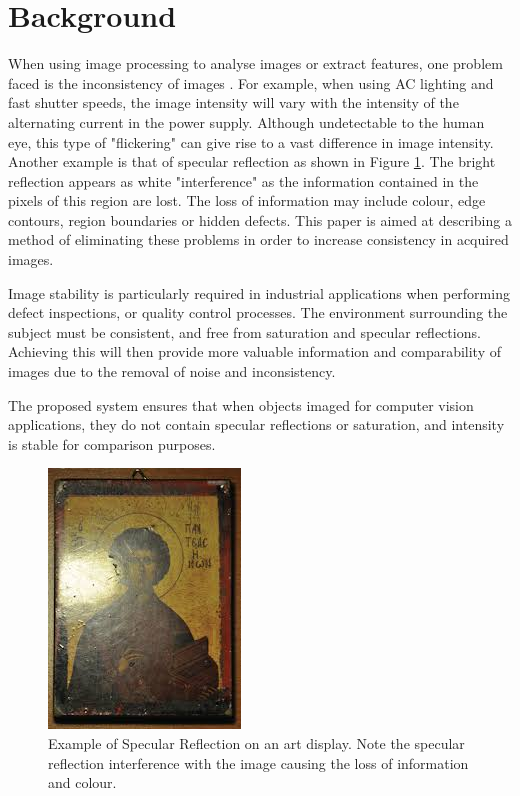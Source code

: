 \documentclass[fleqn,twoside,12pt]{report}
\begin{document}
\section{Background}


When using image processing to analyse images or extract features, one problem faced is the inconsistency of images \cite{atkinson}.  For example, when using AC lighting and fast shutter speeds, the image intensity will vary with the intensity of the alternating current in the power supply. Although undetectable to the human eye, this type of "flickering" can give rise to a vast difference in image intensity. Another example is that of specular reflection as shown in Figure \ref{fig:specular_art}. The bright reflection appears as white "interference" as the information contained in the pixels of this region are lost. The loss of information may include colour, edge contours, region boundaries or hidden defects. This paper is aimed at describing a method of eliminating these problems in order to increase consistency in acquired images.

Image stability is particularly required in industrial applications when performing defect inspections, or quality control processes. The environment surrounding the subject must be consistent, and free from saturation and specular reflections. Achieving this will then provide more valuable information and comparability of images due to the removal of noise and inconsistency.

The proposed system ensures that when objects imaged for computer vision applications, they do not contain specular reflections or saturation, and intensity is stable for comparison purposes. 

\begin{figure}[h]
	\centering
	\includegraphics[scale=0.9]{specular_art.jpg}
	\caption{Example of Specular Reflection on an art display. Note the specular reflection interference with the image causing the loss of information and colour.}
	\label{fig:specular_art}
\end{figure}
\end{document}
